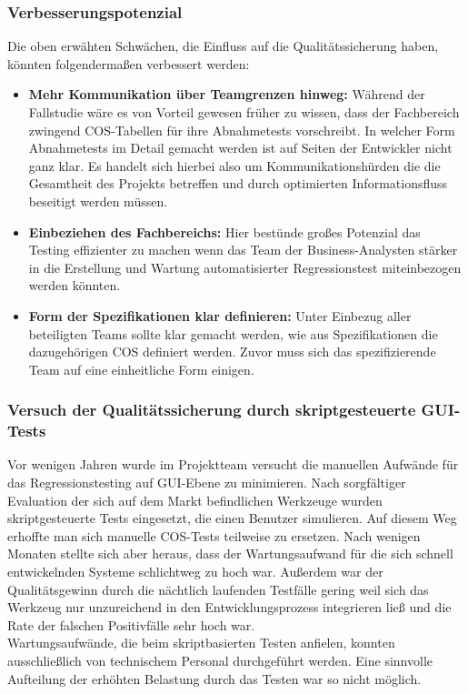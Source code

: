 \subsubsection{Verbesserungspotenzial}
Die oben erwähten Schwächen, die Einfluss auf die Qualitätssicherung haben, könnten folgendermaßen verbessert werden:

\begin{itemize}
\item \textbf{Mehr Kommunikation über Teamgrenzen hinweg:} Während der Fallstudie wäre es von Vorteil gewesen früher zu wissen, dass der Fachbereich zwingend \Gls{COS}-Tabellen für ihre Abnahmetests vorschreibt. In welcher Form Abnahmetests im Detail gemacht werden ist auf Seiten der Entwickler nicht ganz klar. Es handelt sich hierbei also um Kommunikationshürden die die Gesamtheit des Projekts betreffen und durch optimierten Informationsfluss beseitigt werden müssen.
\item \textbf{Einbeziehen des Fachbereichs:} Hier bestünde großes Potenzial das Testing effizienter zu machen wenn das Team der Business-Analysten stärker in die Erstellung und Wartung automatisierter Regressionstest miteinbezogen werden könnten.
\item \textbf{Form der Spezifikationen klar definieren:} Unter Einbezug aller beteiligten Teams sollte klar gemacht werden, wie aus Spezifikationen die dazugehörigen \Gls{COS} definiert werden. Zuvor muss sich das spezifizierende Team auf eine einheitliche Form einigen.
\end{itemize}


\subsubsection{Versuch der Qualitätssicherung durch skriptgesteuerte GUI-Tests}
\label{sec:versuch_script}
Vor wenigen Jahren wurde im Projektteam versucht die manuellen Aufwände für das Regressionstesting auf GUI-Ebene zu minimieren. Nach sorgfältiger Evaluation der sich auf dem Markt befindlichen Werkzeuge wurden skriptgesteuerte Tests eingesetzt, die einen Benutzer simulieren. Auf diesem Weg erhoffte man sich manuelle \Gls{COS}-Tests teilweise zu ersetzen. Nach wenigen Monaten stellte sich aber heraus, dass der Wartungsaufwand für die sich schnell entwickelnden Systeme schlichtweg zu hoch war. Außerdem war der Qualitätsgewinn durch die nächtlich laufenden Testfälle gering weil sich das Werkzeug nur unzureichend in den Entwicklungsprozess integrieren ließ und die Rate der falschen Positivfälle sehr hoch war.\\
Wartungsaufwände, die beim skriptbasierten Testen anfielen, konnten ausschließlich von technischem Personal durchgeführt werden. Eine sinnvolle Aufteilung der erhöhten Belastung durch das Testen war so nicht möglich.

